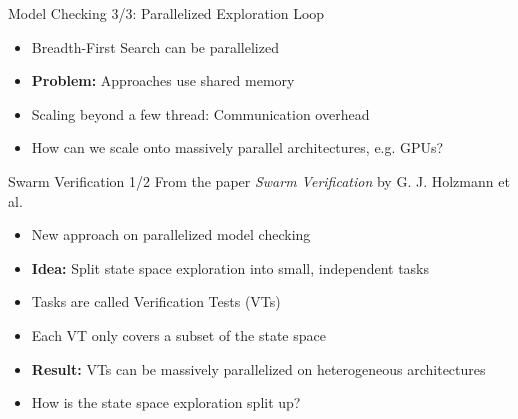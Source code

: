 \documentclass[aspectratio=169]{beamer}
\begin{document}
\begin{frame}{Model Checking 3/3: Parallelized Exploration Loop}
    \begin{itemize}
        \item Breadth-First Search can be parallelized
        \item \textbf{Problem:} Approaches use shared memory
        \item Scaling beyond a few thread: Communication overhead
        \item How can we scale onto massively parallel architectures, e.g. GPUs?
    \end{itemize}
\end{frame}

\begin{frame}{Swarm Verification 1/2}
    From the paper \emph{Swarm Verification} by G. J. Holzmann et al. \cite{Holzmann2008.Swarm-Verification}
    \begin{itemize}
        \item New approach on parallelized model checking
        \item \textbf{Idea:} Split state space exploration into small, independent tasks
        \item Tasks are called Verification Tests (VTs)
        \item Each VT only covers a subset of the state space
        \item \textbf{Result:} VTs can be massively parallelized on heterogeneous architectures
        \item How is the state space exploration split up?
    \end{itemize}
\end{frame}
\end{document}
